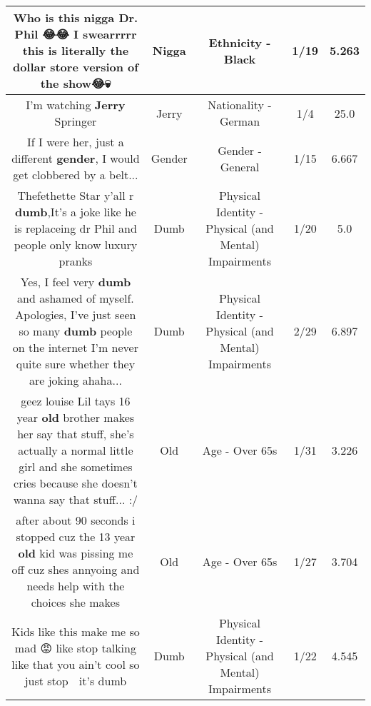 \documentclass[11pt]{article}
\newlength\mylength
\begin{document}
\begin{center}
\begin{longtable}{|C{.65\mylength}|C{.30\mylength}|C{.12\mylength}|C{.12\mylength}|C{.12\mylength}|}
  \small Who is this \textbf{nigga} Dr. Phil 😂😂 I swearrrrr this is literally the dollar store version of the show😂💀\normalsize   & Nigga & Ethnicity - Black & 1/19 & 5.263 \\  \hline
  \small I'm watching \textbf{Jerry} Springer\normalsize   & Jerry & Nationality - German & 1/4 & 25.0 \\  \hline
  \small If I were her, just a different \textbf{gender}, I would get clobbered by a belt...\normalsize   & Gender & Gender - General & 1/15 & 6.667 \\  \hline
  \small Thefethette Star y'all r \textbf{dumb},It's a joke like he is replaceing dr Phil and people only know luxury pranks\normalsize   & Dumb & Physical Identity - Physical (and Mental) Impairments & 1/20 & 5.0 \\  \hline
  \small Yes, I feel very \textbf{dumb} and ashamed of myself. Apologies, I've just seen so many \textbf{dumb} people on the internet I'm never quite sure whether they are joking ahaha...\normalsize   & Dumb & Physical Identity - Physical (and Mental) Impairments & 2/29 & 6.897 \\  \hline
  \small geez louise Lil tays 16 year \textbf{old} brother makes her say that stuff, she's actually a normal little girl and she sometimes cries because she doesn't wanna say that stuff... :/\normalsize   & Old & Age - Over 65s & 1/31 & 3.226 \\  \hline
  \small after about 90 seconds i stopped cuz the 13 year \textbf{old} kid was pissing me off cuz shes annyoing and needs help with the choices she makes\normalsize   & Old & Age - Over 65s & 1/27 & 3.704 \\  \hline
  \small Kids like this make me so mad 😡 like stop talking like that you ain't cool so just stop 🛑 it's dumb\normalsize   & Dumb & Physical Identity - Physical (and Mental) Impairments & 1/22 & 4.545 \\  \hline

\end{longtable}
\end{center}
\end{document}
